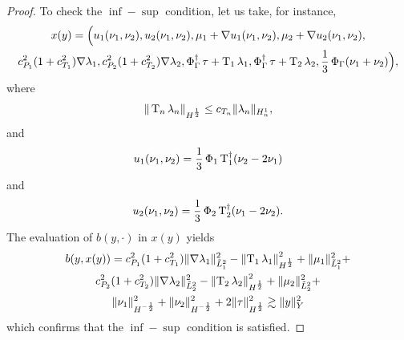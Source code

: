\begin{proof}
To check the $\inf-\sup$ condition, let us take, for instance,
\begin{multline}
x(y) =
\Big(
u_1(\nu_1, \nu_2), u_2(\nu_1, \nu_2), \mu_1+\nabla u_1(\nu_1, \nu_2), \mu_2+\nabla u_2(\nu_1, \nu_2),
\\
c_{P_1}^2(1+c_{T_1}^2)\nabla \lambda_1, c_{P_2}^2(1+c_{T_2}^2)\nabla \lambda_2, \operatorname{\Phi}^\dagger_\Gamma \tau + \operatorname{T}_1 \lambda_1, \operatorname{\Phi}^\dagger_\Gamma \tau + \operatorname{T}_2 \lambda_2, \frac13\operatorname{\Phi}_\Gamma(\nu_1+\nu_2)
\Big),    
\end{multline}
where
\begin{equation}
\|\operatorname{T}_n \lambda_n\|_{H^\frac12} \leq c_{T_n} \|\lambda_n\|_{H^1_n},
\end{equation}
and
\begin{equation}
    u_1(\nu_1, \nu_2) = \frac13\operatorname{\Phi}_1 \operatorname{T}^\dagger_1 (\nu_2-2\nu_1)
\end{equation}
and
\begin{equation}
    u_2(\nu_1, \nu_2) = \frac13\operatorname{\Phi}_2 \operatorname{T}^\dagger_2 (\nu_1-2\nu_2).
\end{equation}
The evaluation of $b(y, \cdot)$ in $x(y)$ yields
\begin{multline}
b(y, x(y)) = 
c_{P_1}^2(1+c_{T_1}^2)\|\nabla \lambda_1\|^2_{\tilde{L}^2_1}-\left\| \operatorname{T}_1 \lambda_1 \right\|^2_{H^\frac12}+\|\mu_1\|^2_{\tilde{L}^2_1}+
\\
c_{P_2}^2(1+c_{T_2}^2)\|\nabla \lambda_2\|^2_{\tilde{L}^2_2}-\left\| \operatorname{T}_2 \lambda_2 \right\|^2_{H^\frac12}+\|\mu_2\|^2_{\tilde{L}^2_2}+
\\
\|\nu_1\|^2_{H^{-\frac12}}+\|\nu_2\|^2_{H^{-\frac12}}+2\|\tau\|^2_{H^\frac12} \gtrsim \|y\|^2_{Y}    
\end{multline}
which confirms that the $\inf-\sup$ condition is satisfied.
\end{proof}

